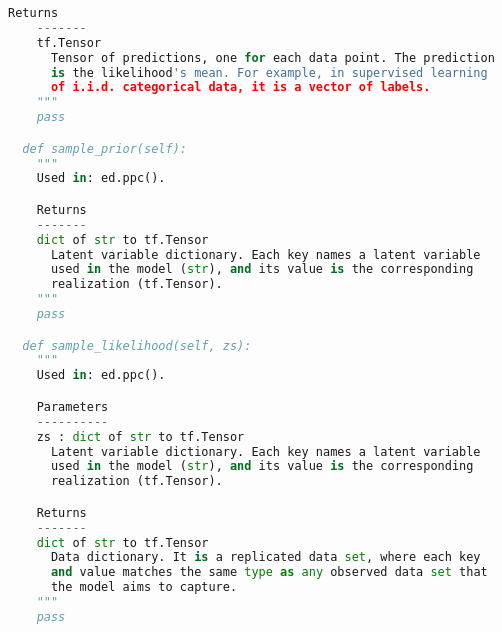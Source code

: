 \begin{lstlisting}[language=Python]
    Returns
    -------
    tf.Tensor
      Tensor of predictions, one for each data point. The prediction
      is the likelihood's mean. For example, in supervised learning
      of i.i.d. categorical data, it is a vector of labels.
    """
    pass

  def sample_prior(self):
    """
    Used in: ed.ppc().

    Returns
    -------
    dict of str to tf.Tensor
      Latent variable dictionary. Each key names a latent variable
      used in the model (str), and its value is the corresponding
      realization (tf.Tensor).
    """
    pass

  def sample_likelihood(self, zs):
    """
    Used in: ed.ppc().

    Parameters
    ----------
    zs : dict of str to tf.Tensor
      Latent variable dictionary. Each key names a latent variable
      used in the model (str), and its value is the corresponding
      realization (tf.Tensor).

    Returns
    -------
    dict of str to tf.Tensor
      Data dictionary. It is a replicated data set, where each key
      and value matches the same type as any observed data set that
      the model aims to capture.
    """
    pass
\end{lstlisting}

